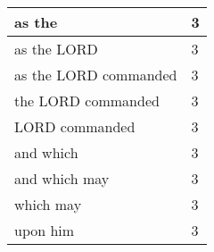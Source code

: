 \begin{center}
\begin{longtable}{|p{3.0in}|p{0.5in}|}
as the & 3\\ \hline 
as the LORD & 3\\ \hline 
as the LORD commanded & 3\\ \hline 
the LORD commanded & 3\\ \hline 
LORD commanded & 3\\ \hline 
and which & 3\\ \hline 
and which may & 3\\ \hline 
which may & 3\\ \hline 
upon him & 3\\ \hline 
\end{longtable}
\end{center}





